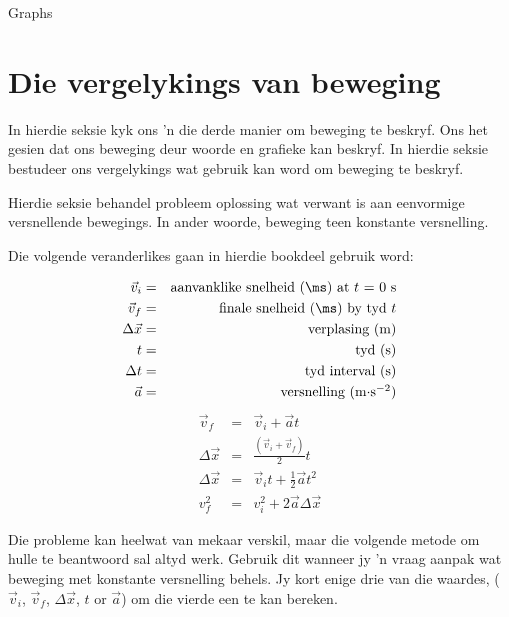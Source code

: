 \begin{exercises}{Graphs}
\end{exercises}


\section{Die vergelykings van beweging}
    \nopagebreak
      
In hierdie seksie kyk ons  'n die derde manier om beweging te beskryf. Ons het gesien dat ons beweging deur woorde en grafieke kan beskryf. In hierdie seksie bestudeer ons vergelykings wat gebruik kan word om beweging te beskryf.\par

Hierdie seksie behandel probleem oplossing wat verwant is aan eenvormige versnellende bewegings. In ander woorde, beweging teen konstante versnelling.

Die volgende veranderlikes gaan in hierdie bookdeel gebruik word:\par      
      
\label{m38796*id75611}\nopagebreak\noindent{}
\begin{eqnarray*}
\vec{v}_i &=& \mbox{aanvanklike snelheid (\ms) at $t$ = 0 s} \\
\vec{v}_f &=& \mbox{finale snelheid (\ms) by tyd $t$}\\
\Delta \vec{x} &=& \mbox{verplasing (m)} \\
t &=& \mbox{tyd (s)} \\
\Delta t &=& \mbox{tyd interval (s)} \\
\vec{a} &=& \mbox{versnelling (m$\cdot$s$^{-2}$)}
\end{eqnarray*}
      \label{m38796*eip-506}\nopagebreak\noindent{}
\begin{eqnarray}
\vec{v}_f &=& \vec{v}_i + \vec{a}t \label{eq:eq1}\\
\Delta \vec{x} &=& \frac{(\vec{v}_i + \vec{v}_f)}{2} t\label{eq:eq2}\\
\Delta \vec{x} &=& \vec{v}_it + \frac{1}{2}\vec{a}t^2 \label{eq:eq3}\\
v_f^2 &=& v_i^2 + 2\vec{a} \Delta \vec{x} \label{eq:eq4}
\end{eqnarray}

Die probleme kan heelwat van mekaar verskil, maar die volgende metode om hulle te beantwoord sal altyd werk. Gebruik dit wanneer jy  'n vraag aanpak wat beweging met konstante versnelling behels. Jy kort enige drie van die waardes, ($\vec{v}_{i}$, $\vec{v}_{f}$, $\Delta \vec{x}$, $t$ or $\vec{a}$) om die vierde een te kan bereken.\par

